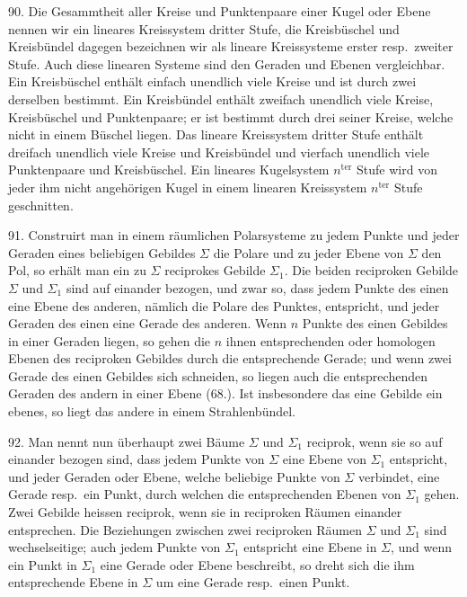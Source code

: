 90. Die Gesammtheit aller Kreise und Punktenpaare
einer Kugel oder Ebene nennen wir ein {\glqq}lineares Kreissystem
dritter Stufe{\grqq}, die Kreisb\"uschel und Kreisb\"undel dagegen
bezeichnen wir als {\glqq}lineare Kreissysteme erster resp.\ zweiter
Stufe{\grqq}. Auch diese linearen Systeme sind den Geraden und
Ebenen vergleichbar. Ein Kreisb\"uschel enth\"alt einfach unendlich
viele Kreise und ist durch zwei derselben bestimmt.
Ein Kreisb\"undel enth\"alt zweifach unendlich viele Kreise,
Kreisb\"uschel und Punktenpaare; er ist bestimmt durch drei
seiner Kreise, welche nicht in einem B\"uschel liegen. Das
lineare Kreissystem dritter Stufe enth\"alt dreifach unendlich
viele Kreise und Kreisb\"undel und vierfach unendlich viele
Punktenpaare und Kreisb\"uschel. Ein lineares Kugelsystem
$n^{\text{ter}}$ Stufe wird von jeder ihm nicht angeh\"origen Kugel in
einem linearen Kreissystem $n^{\text{ter}}$ Stufe geschnitten.

\begin{center}
\makebox[15em]{\hrulefill}
\end{center}


\label{p10}


\hspace{\parindent}%
91. Construirt man in einem r\"aumlichen Polarsysteme
zu jedem Punkte und jeder Geraden eines beliebigen Gebildes
$\varSigma$ die Polare und zu jeder Ebene von $\varSigma$ den Pol, so erh\"alt
man ein zu $\varSigma$ {\glqq}reciprokes{\grqq} Gebilde $\varSigma_1$. Die beiden reciproken
Gebilde $\varSigma$ und $\varSigma_1$ sind auf einander {\glqq}bezogen{\grqq}, und
zwar so, dass jedem Punkte des einen eine Ebene des anderen,
n\"amlich die Polare des Punktes, entspricht, und jeder
Geraden des einen eine Gerade des anderen. Wenn $n$ Punkte
des einen Gebildes in einer Geraden liegen, so gehen die $n$
ihnen entsprechenden oder {\glqq}homologen{\grqq} Ebenen des reciproken
Gebildes durch die entsprechende Gerade; und wenn
zwei Gerade des einen Gebildes sich schneiden, so liegen
auch die entsprechenden Geraden des andern in einer Ebene
(68.). Ist insbesondere das eine Gebilde ein ebenes, so liegt
das andere in einem Strahlenb\"undel.

92. Man nennt nun \"uberhaupt zwei B\"aume $\varSigma$ und $\varSigma_1$
{\glqq}reciprok{\grqq}, wenn sie so auf einander bezogen sind, dass
jedem Punkte von $\varSigma$ eine Ebene von $\varSigma_1$ entspricht, und jeder
Geraden oder Ebene, welche beliebige Punkte von $\varSigma$ verbindet,
eine Gerade resp.\ ein Punkt, durch welchen die entsprechenden
Ebenen von $\varSigma_1$ gehen. Zwei Gebilde heissen
reciprok, wenn sie in reciproken R\"aumen einander entsprechen.
Die Beziehungen zwischen zwei reciproken R\"aumen $\varSigma$ und
$\varSigma_1$ sind wechselseitige; auch jedem Punkte von $\varSigma_1$ entspricht
eine Ebene in $\varSigma$, und wenn ein Punkt in $\varSigma_1$ eine Gerade
oder Ebene beschreibt, so dreht sich die ihm entsprechende
Ebene in $\varSigma$ um eine Gerade resp.\ einen Punkt.

